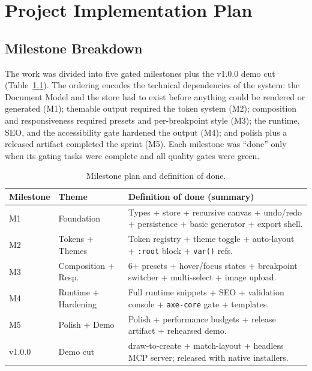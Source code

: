 
\chapter{Project Implementation Plan}
\label{ch:plan}

\section{Milestone Breakdown}
The work was divided into five gated milestones plus the v1.0.0 demo cut
(Table~\ref{tab:milestones}). The ordering encodes the technical dependencies of
the system: the Document Model and the store had to exist before anything could be
rendered or generated (M1); themable output required the token system (M2);
composition and responsiveness required presets and per-breakpoint style (M3); the
runtime, SEO, and the accessibility gate hardened the output (M4); and polish plus
a released artifact completed the sprint (M5). Each milestone was ``done'' only
when its gating tasks were complete and all quality gates were green.

\begin{table}[H]
  \centering
  \caption{Milestone plan and definition of done.}
  \label{tab:milestones}
  \begin{tabularx}{\linewidth}{@{}l l X@{}}
    \toprule
    \textbf{Milestone} & \textbf{Theme} & \textbf{Definition of done (summary)} \\
    \midrule
    M1 & Foundation            & Types + store + recursive canvas + undo/redo + persistence + basic generator + export shell. \\
    M2 & Tokens + Themes       & Token registry + theme toggle + auto-layout + \texttt{:root} block + \texttt{var()} refs. \\
    M3 & Composition + Resp.   & 6+ presets + hover/focus states + breakpoint switcher + multi-select + image upload. \\
    M4 & Runtime + Hardening   & Full runtime snippets + SEO + validation console + \texttt{axe-core} gate + templates. \\
    M5 & Polish + Demo         & Polish + performance budgets + release artifact + rehearsed demo. \\
    v1.0.0 & Demo cut          & draw-to-create + match-layout + headless MCP server; released with native installers. \\
    \bottomrule
  \end{tabularx}
\end{table}

